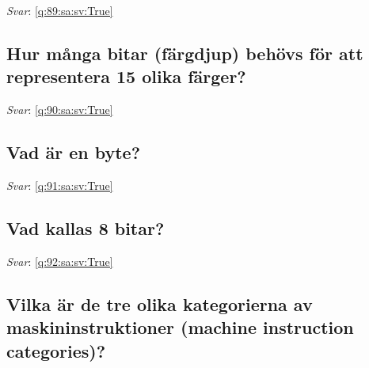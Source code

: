 \documentclass[a4paper,11pt,oneside]{article}
\begin{document}
\begin{sloppypar}
\textit{Svar}: \autoref{q:89:sa:sv:True}



\subsection{Hur m\r{a}nga bitar (f\"argdjup) beh\"ovs f\"or att representera 15 olika f\"arger?}

\label{q:90:sa:sv:False}

\vspace{2cm}

\noindent\makebox[\textwidth]{\hrulefill}

\vspace{1cm}

\textit{Svar}: \autoref{q:90:sa:sv:True}



\subsection{Vad \"ar en byte?}

\label{q:91:sa:sv:False}

\vspace{2cm}

\noindent\makebox[\textwidth]{\hrulefill}

\vspace{1cm}

\textit{Svar}: \autoref{q:91:sa:sv:True}



\subsection{Vad kallas 8 bitar?}

\label{q:92:sa:sv:False}

\vspace{2cm}

\noindent\makebox[\textwidth]{\hrulefill}

\vspace{1cm}

\textit{Svar}: \autoref{q:92:sa:sv:True}



\subsection{Vilka \"ar de tre olika kategorierna av maskininstruktioner (machine instruction categories)?}

\label{q:93:sa:sv:False}


\end{sloppypar}
\end{document}
